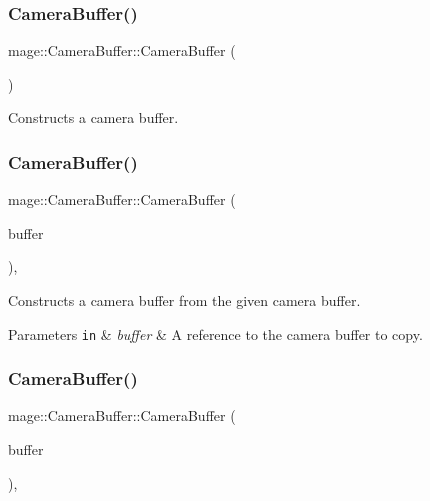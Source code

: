 \subsubsection{\texorpdfstring{Camera\+Buffer()}{CameraBuffer()}\hspace{0.1cm}{\footnotesize\ttfamily [1/3]}}
{\footnotesize\ttfamily mage\+::\+Camera\+Buffer\+::\+Camera\+Buffer (\begin{DoxyParamCaption}{ }\end{DoxyParamCaption})\hspace{0.3cm}{\ttfamily [noexcept]}}

Constructs a camera buffer. \hypertarget{structmage_1_1_camera_buffer_a83b3397d4a064cd6982da5caea2c05e5}{}\label{structmage_1_1_camera_buffer_a83b3397d4a064cd6982da5caea2c05e5} 
\subsubsection{\texorpdfstring{Camera\+Buffer()}{CameraBuffer()}\hspace{0.1cm}{\footnotesize\ttfamily [2/3]}}
{\footnotesize\ttfamily mage\+::\+Camera\+Buffer\+::\+Camera\+Buffer (\begin{DoxyParamCaption}\item[{const \hyperlink{structmage_1_1_camera_buffer}{Camera\+Buffer} \&}]{buffer }\end{DoxyParamCaption})\hspace{0.3cm}{\ttfamily [default]}, {\ttfamily [noexcept]}}

Constructs a camera buffer from the given camera buffer.


\begin{DoxyParams}[1]{Parameters}
\mbox{\tt in}  & {\em buffer} & A reference to the camera buffer to copy. \\
\hline
\end{DoxyParams}
\hypertarget{structmage_1_1_camera_buffer_ade4f3fe1bd833a3f6ed43eadd0ffc241}{}\label{structmage_1_1_camera_buffer_ade4f3fe1bd833a3f6ed43eadd0ffc241} 
\subsubsection{\texorpdfstring{Camera\+Buffer()}{CameraBuffer()}\hspace{0.1cm}{\footnotesize\ttfamily [3/3]}}
{\footnotesize\ttfamily mage\+::\+Camera\+Buffer\+::\+Camera\+Buffer (\begin{DoxyParamCaption}\item[{\hyperlink{structmage_1_1_camera_buffer}{Camera\+Buffer} \&\&}]{buffer }\end{DoxyParamCaption})\hspace{0.3cm}{\ttfamily [default]}, {\ttfamily [noexcept]}}

